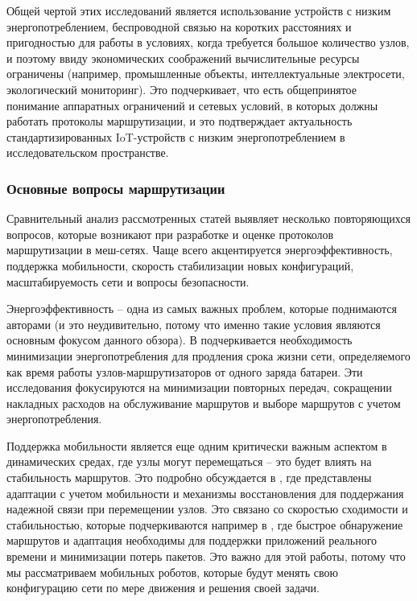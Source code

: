 \documentclass[%
]{report}
\begin{document}
Общей чертой этих исследований является использование
устройств с низким энергопотреблением,
беспроводной связью на коротких расстояниях
и пригодностью для работы в условиях,
когда требуется большое количество узлов,
и поэтому ввиду экономических соображений
вычислительные ресурсы ограничены
(например, промышленные объекты,
интеллектуальные электросети,
экологический мониторинг).
Это подчеркивает, что есть общепринятое понимание
аппаратных ограничений и сетевых условий,
в которых должны работать протоколы маршрутизации,
и это подтверждает актуальность стандартизированных
IoT-устройств с низким энергопотреблением в
исследовательском пространстве.


\subsubsection{Основные вопросы маршрутизации}\label{main-network-routing-considerations}

Сравнительный анализ рассмотренных статей
выявляет несколько повторяющихся вопросов,
которые возникают при разработке
и оценке протоколов маршрутизации в меш-сетях.
Чаще всего акцентируется
энергоэффективность, поддержка мобильности,
скорость стабилизации новых конфигураций,
масштабируемость сети
и вопросы безопасности.

Энергоэффективность -- одна из самых важных проблем,
которые поднимаются авторами
(и это неудивительно,
потому что именно такие условия
являются основным фокусом данного обзора).
В \textcite{KRENTZ202457}
подчеркивается необходимость минимизации
энергопотребления для продления срока жизни сети,
определяемого как время работы узлов-маршрутизаторов
от одного заряда батареи.
Эти исследования фокусируются на минимизации
повторных передач, сокращении накладных расходов
на обслуживание маршрутов и выборе маршрутов
с учетом энергопотребления.

Поддержка мобильности является еще одним
критически важным аспектом в динамических средах,
где узлы могут перемещаться -- это будет влиять на
стабильность маршрутов.
Это подробно обсуждается в \textcite{SHARMA2013416},
где представлены адаптации с учетом
мобильности и механизмы восстановления
для поддержания надежной связи при перемещении узлов.
Это связано со скоростью сходимости и стабильностью,
которые подчеркиваются например в \textcite{LI2020570},
где быстрое обнаружение маршрутов
и адаптация необходимы для поддержки
приложений реального времени и минимизации потерь пакетов.
Это важно для этой работы,
потому что мы рассматриваем мобильных роботов,
которые будут менять свою конфигурацию сети
по мере движения и решения своей задачи.
\end{document}
